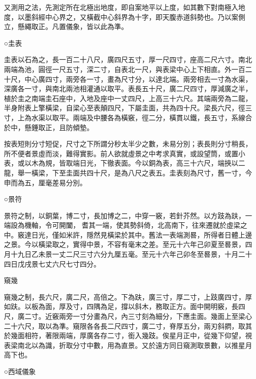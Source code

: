 \begin{pinyinscope}
 又測用之法，先測定所在北極出地度，即自案地平以上度，如其數下對南極入地度，以墨斜經中心界之，又橫截中心斜界為十字，即天腹赤道斜勢也。乃以案側立，懸繩取正。凡置儀象，皆以此為準。



 ○圭表



 圭表以石為之，長一百二十八尺，廣四尺五寸，厚一尺四寸，座高二尺六寸。南北兩端為池，圓徑一尺五寸，深二寸，自表北一尺，與表梁中心上下相直。外一百二十尺，中心廣四寸，兩旁各一寸，畫為尺寸分，以達北端。兩旁相去一寸為水渠，深廣各一寸，與南北兩池相灌通以取平。表長五十尺，廣二尺四寸，厚減廣之半，植於圭之南端圭石座中，入地及座中一丈四尺，上高三十六尺。其端兩旁為二龍，半身附表上擎橫梁，自梁心至表顛四尺，下屬圭面，共為四十尺。梁長六尺，徑三寸，上為水渠以取平。兩端及中腰各為橫竅，徑二分，橫貫以鐵，長五寸，系線合於中，懸錘取正，且防傾墊。



 按表短則分寸短促，尺寸之下所謂分秒太半少之數，未易分別；表長則分寸稍長，所不便者景虛而淡，難得實影。前人欲就虛景之中考求真實，或設望筒，或置小表，或以木為規，皆取端日光，下徹表面。今以銅為表，高三十六尺，端挾以二龍，舉一橫梁，下至圭面共四十尺，是為八尺之表五。圭表刻為尺寸，舊一寸，今申而為五，厘毫差易分別。



 ○景符



 景符之制，以銅葉，博二寸，長加博之二，中穿一竅，若針芥然。以方跂為趺，一端設為機軸，令可開闔，耆其一端，使其勢斜倚，北高南下，往來遷就於虛梁之中。竅達日光，僅如米許，隱然見橫梁於其中。舊法一表端測晷，所得者日體上邊之景。今以橫梁取之，實得中景，不容有毫末之差。至元十六年己卯夏至晷景，四月十九日乙未景一丈二尺三寸六分九厘五毫。至元十六年己卯冬至晷景，十月二十四日戊戌景七丈六尺七寸四分。



 窺幾



 窺幾之制，長六尺，廣二尺，高倍之。下為趺，廣三寸，厚二寸，上跂廣四寸，厚如趺。以板為面，厚及寸，四隅為足，撐以斜木，務取正方。面中開明竅，長四尺，廣二寸。近竅兩旁一寸分畫為尺，內三寸刻為細分，下應圭面。幾面上至梁心二十六尺，取以為準。窺限各各長二尺四寸，廣二寸，脊厚五分，兩刃斜閷，取其於幾面相符，著限兩端，厚廣各存二寸，銜入幾跂。俟星月正中，從幾下仰望，視表梁南北以為識，折取分寸中數，用為直景。又於遠方同日窺測取景數，以推星月高下也。



 ○西域儀象




\end{pinyinscope}
